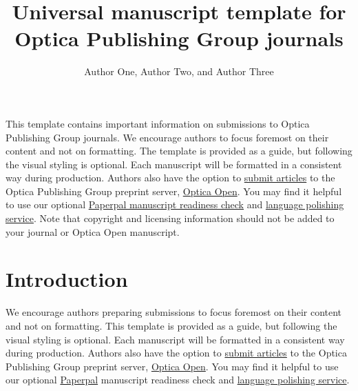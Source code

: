 \documentclass{optica-article}
\begin{document}
\title{Universal manuscript template for Optica Publishing Group journals}

\author{Author One, Author Two, and Author Three}

\address{Peer Review, Publications Department, Optica Publishing Group, 2010 Massachusetts Avenue NW, Washington, DC 20036, USA\\
Publications Department, Optica Publishing Group, 2010 Massachusetts Avenue NW, Washington, DC 20036, USA\\
Currently with the Department of Electronic Journals, Optica Publishing Group, 2010 Massachusetts Avenue NW, Washington, DC 20036, USA}



\begin{abstract*} 
This template contains important information on submissions to Optica Publishing Group journals. We encourage authors to focus foremost on their content and not on formatting. The template is provided as a guide, but following the visual styling is optional. Each manuscript will be formatted in a consistent way during production. Authors also have the option to \href{https://opticaopen.org}{submit articles} to the Optica Publishing Group preprint server, \href{https://opticaopen.org/figshare}{Optica Open}. You may find it helpful to use our optional \href{https://preflight.paperpal.com/partner/optica/opticapublishinggroupjournals}{Paperpal manuscript readiness check}  and \href{https://languageediting.optica.org/}{language polishing service}. Note that copyright and licensing information should not be added to your journal or Optica Open manuscript. 

\end{abstract*}

\section{Introduction}
 We encourage authors preparing submissions to focus foremost on their content and not on formatting. This template is provided as a guide, but following the visual styling is optional. Each manuscript will be formatted in a consistent way during production. Authors also have the option to  \href{https://opticaopen.org}{submit articles} to the Optica Publishing Group preprint server, \href{https://preprints.opticaopen.org}{Optica Open}. You may find it helpful to use our optional \href{https://preflight.paperpal.com/partner/optica/opticapublishinggroupjournals}{Paperpal} manuscript readiness check and \href{https://languageediting.optica.org/}{language polishing service}.  
\end{document}
